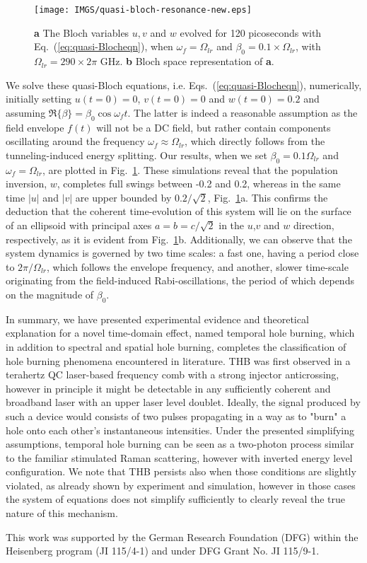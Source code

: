 \documentclass[reprint,secnumarabic,amssymb, nobibnotes, aip, prd]{revtex4-1}
\begin{document}
\begin{figure}[h!]
	\begin{center}
		\texttt{[image: IMGS/quasi-bloch-resonance-new.eps]}
		\caption{\textbf{a} The Bloch variables $u,v$ and $w$ evolved for 120 picoseconds with Eq.~(\ref{eq:quasi-Blocheqn}), when $\omega_f = \Omega_{lr}$ and $\beta_0 = 0.1\times\Omega_{lr}$, with $\Omega_{lr} = 290\times 2\pi$ GHz. \textbf{b} Bloch space representation of \textbf{a}.} \label{fig:quasi-bloch-resonance}
	\end{center}	
\end{figure}
We solve these quasi-Bloch equations, i.e. Eqs.~(\ref{eq:quasi-Blocheqn}), numerically, initially setting $u(t=0)=0$, $v(t=0) = 0$ and $w(t=0) = 0.2$ and assuming $\Re\{\beta\} = \beta_0 \cos\omega_f t$. The latter is indeed a reasonable assumption as the field envelope $f(t)$ will not be a DC field, but rather contain components oscillating around the frequency $\omega_f \approx \Omega_{lr}$, which directly follows from the tunneling-induced energy splitting. Our results, when we set $\beta_0 = 0.1\Omega_{lr}$ and $\omega_f = \Omega_{lr}$, are plotted in Fig.~\ref{fig:quasi-bloch-resonance}. These simulations reveal that the population inversion, $w$, completes full swings between -0.2 and 0.2, whereas in the same time $|u|$ and $|v|$ are upper bounded by $0.2/\sqrt{2}$, Fig.~\ref{fig:quasi-bloch-resonance}a. This confirms the deduction that the coherent time-evolution of this system will lie on the surface of an ellipsoid with principal axes $a=b=c/\sqrt{2}$ in the $u$,$v$ and $w$ direction, respectively, as it is evident from Fig.~\ref{fig:quasi-bloch-resonance}b. Additionally, we can observe that the system dynamics is governed by two time scales: a fast one, having a period close to $2\pi/\Omega_{lr}$, which follows the envelope frequency, and another, slower time-scale originating from the field-induced Rabi-oscillations, the period of which depends on the magnitude of $\beta_0$.  

In summary, we have presented experimental evidence and theoretical explanation for a novel time-domain effect, named temporal hole burning, which in addition to spectral and spatial hole burning, completes the classification of hole burning phenomena encountered in  literature. THB was first observed in a terahertz QC laser-based frequency comb with a strong injector anticrossing\cite{burghoff2015evaluating}, however in principle it might be detectable in any sufficiently coherent and broadband laser with an upper laser level doublet. Ideally, the signal produced by such a device would consists of two pulses propagating in a way as to "burn" a hole onto each other's instantaneous intensities. Under the presented simplifying assumptions, temporal hole burning can be seen as a two-photon process similar to the familiar stimulated Raman scattering, however with inverted energy level configuration. We note that THB persists also when those conditions are slightly violated, as already shown by experiment\cite{burghoff2015evaluating} and simulation\cite{petz2016}, however in those cases the system of equations does not simplify sufficiently to clearly reveal the true nature of this mechanism. 

This work was supported by the German Research Foundation (DFG) within the Heisenberg program (JI 115/4-1) and under DFG Grant No. JI 115/9-1.

\end{document}
